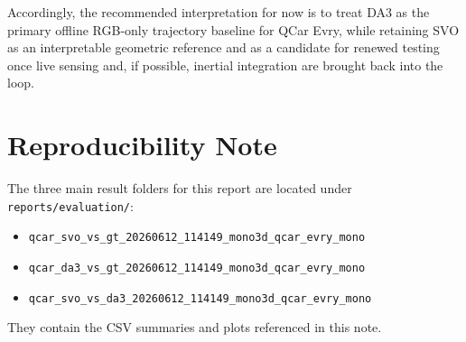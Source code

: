 \documentclass[conference]{IEEEtran}
\newcommand{\code}[1]{\mbox{\texttt{#1}}}
\begin{document}
Accordingly, the recommended interpretation for now is to treat DA3 as the primary offline RGB-only trajectory baseline for QCar Evry, while retaining SVO as an interpretable geometric reference and as a candidate for renewed testing once live sensing and, if possible, inertial integration are brought back into the loop.

\section*{Reproducibility Note}
The three main result folders for this report are located under \code{reports/evaluation/}:
\begin{itemize}
\item \texttt{qcar\_svo\_vs\_gt\_20260612\_114149\_mono3d\_qcar\_evry\_mono}
\item \texttt{qcar\_da3\_vs\_gt\_20260612\_114149\_mono3d\_qcar\_evry\_mono}
\item \texttt{qcar\_svo\_vs\_da3\_20260612\_114149\_mono3d\_qcar\_evry\_mono}
\end{itemize}
They contain the CSV summaries and plots referenced in this note.



\end{document}
